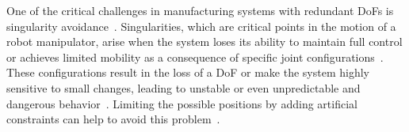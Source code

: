 One of the critical challenges in manufacturing systems with redundant \acrshort{DoF}s is singularity avoidance~\cite{Kireanski.1993, Wang.2022}. Singularities, which are critical points in the motion of a robot manipulator, arise when the system loses its ability to maintain full control or achieves limited mobility as a consequence of specific joint configurations~\cite{Malyshev.2022}. These configurations result in the loss of a \acrshort{DoF} or make the system highly sensitive to small changes, leading to unstable or even unpredictable and dangerous behavior~\cite{Zhao.2021, Milenkovic.2021}. Limiting the possible positions by adding artificial constraints can help to avoid this problem~\cite{Faria.2018}. %





